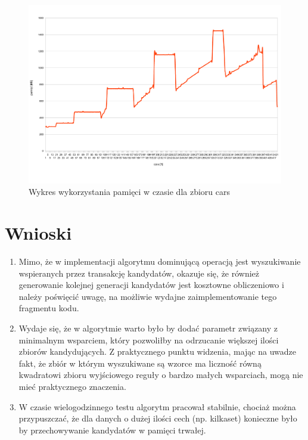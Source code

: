 \documentclass[a4paper,12pt]{article}
\begin{document}
\begin{figure}[h!]
\begin{center}
\includegraphics[width=\textwidth]{img/pamiec.pdf}
\caption{Wykres wykorzystania pamięci w czasie dla zbioru cars}
\label{pamiec}
\end{center}
\end{figure}

\section{Wnioski}

\begin{enumerate}

\item Mimo, że w implementacji algorytmu dominującą operacją jest wyszukiwanie wspieranych przez transakcję kandydatów, okazuje się, że również generowanie kolejnej generacji kandydatów jest kosztowne obliczeniowo i należy poświęcić uwagę, na możliwie wydajne zaimplementowanie tego fragmentu kodu. 

\item Wydaje się, że w algorytmie warto było by dodać parametr związany z minimalnym wsparciem, który pozwoliłby na odrzucanie większej ilości zbiorów kandydujących. Z praktycznego punktu widzenia, mając na uwadze fakt, że zbiór w którym wyszukiwane są wzorce ma liczność równą kwadratowi zbioru wyjściowego reguły o bardzo małych wsparciach, mogą nie mieć praktycznego znaczenia.

\item W czasie wielogodzinnego testu algorytm pracował stabilnie, chociaż można przypuszczać, że dla danych o dużej ilości cech (np. kilkaset) konieczne było by przechowywanie kandydatów w pamięci trwałej.

\end{enumerate}
\end{document}
